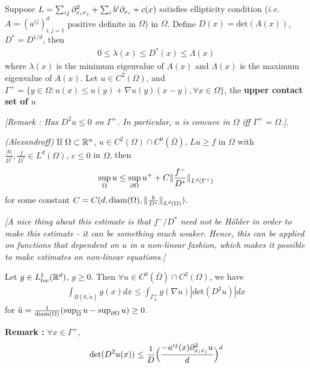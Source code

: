 \documentclass[12pt,a4paper]{article}
\begin{document}
Suppose $L = \sum_{ij} \partial^2_{x_i x_j} + \sum_{i} b^i \partial_{x_i} + c(x)$ satisfies ellipticity condition (\textit{i.e.} $A = (a^{ij})_{i,j=1}^d$ positive definite in $\Omega$) in $\Omega$. Define $D(x) = \text{det}(A(x))$, $D^* = D^{1/d}$, then
\begin{align*}
0\leq \lambda(x) \leq D^*(x) \leq \Lambda(x)
\end{align*}
where $\lambda(x)$ is the minimum eigenvalue of $A(x)$ and $\Lambda(x)$ is the maximum eigenvalue of $A(x)$. Let $u\in C^2(\Omega)$, and $\Gamma^+ = \{y\in \Omega : u(x)\leq u(y) + \nabla u(y)(x-y), \forall x\in \Omega\}$, the \textbf{upper contact set of $u$}

\emph{[Remark : Has $D^2 u \leq 0$ on $\Gamma^+$. In particular, $u$ is concave in $\Omega$ iff $\Gamma^+ =\Omega$.]}.
\s

\thm \emph{(Alexandroff)} If $\Omega \subset \mathbb{R}^n$, $u\in C^2(\Omega) \cap C^0(\bar{\Omega})$, $Lu \geq f$ in $\Omega$ with $\frac{|b|}{D^*}, \frac{f}{D^*} \in L^d(\Omega)$, $c\leq 0$ in $\Omega$, then
\begin{align*}
\sup_{\Omega} u \leq \sup_{\pa \Omega} u^+ + C\snorms{\frac{f^-}{D^*}}{L^d(\Gamma^+)}
\end{align*}
for some constant $C = C(d, \text{diam}(\Omega), \snorms{\frac{b}{D^*}}{L^d(\Omega)})$.

\emph{[A nice thing about this estimate is that $f^-/D^*$ need not be H\"older in order to make this estimate - it can be something much weaker. Hence, this can be applied on functions that dependent on $u$ in a non-linear fashion, which makes it possible to make estimates on non-linear equations.]}
\s

\lem Let $g \in L^1_{loc}(\mathbb{R}^d)$, $g\geq 0$. Then $\forall u \in C^0(\bar{\Omega}) \cap C^2(\Omega)$, we have
\begin{align*}
\int_{B(0, \tilde{u})}g(x) dx \leq \int_{\Gamma_{u}^+} g(\nabla u) |\text{det}(D^2 u)|dx
\end{align*}
for $\tilde{u} = \frac{1}{\text{diam}(\Omega)} (\sup_{\overline{\Omega}} u - \sup_{\partial \Omega} u) \geq 0$.
\s

\textbf{Remark :} $\forall x\in \Gamma^+$,
\begin{align*}
\text{det}(D^2u(x))\leq \frac{1}{D} \Big( \frac{-a^{ij}(x) \partial^2_{x_i x_j}u}{d}\Big)^d
\end{align*}
\s
\end{document}
